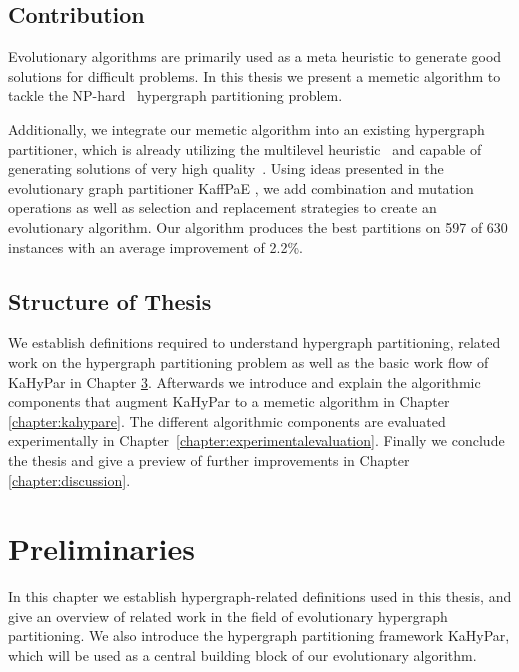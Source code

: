 \documentclass[a4paper,12pt,titlepage, BCOR7mm,headsepline]{scrbook}
\numberwithin{equation}{section}
\begin{document}
\section{Contribution}
Evolutionary algorithms are primarily used as a meta heuristic to generate good solutions for difficult problems. %
In this thesis we present a memetic algorithm to tackle the NP-hard~\cite{garey2002computers} hypergraph partitioning problem.

Additionally, we integrate our memetic algorithm into an existing hypergraph partitioner, which is already utilizing the multilevel heuristic~\cite{bulucc2016recent} and capable of generating solutions of very high quality~\cite{schlag2016k}. Using ideas presented in the evolutionary graph partitioner KaffPaE \cite{sanders2012distributed}, we add combination and mutation operations as well as selection and replacement strategies to create an evolutionary algorithm. Our algorithm produces the best partitions on 597 of 630 instances with an average improvement of 2.2\%.
\section{Structure of Thesis}
We establish definitions required to understand hypergraph partitioning, related work on the hypergraph partitioning problem as well as the basic work flow of KaHyPar in Chapter \ref{chapter:preliminaries}.
Afterwards we introduce and explain the algorithmic components that augment KaHyPar to a memetic algorithm in Chapter \ref{chapter:kahypare}. 
The different algorithmic components are evaluated experimentally in Chapter~\ref{chapter:experimentalevaluation}.
Finally we conclude the thesis and give a preview of further improvements in Chapter \ref{chapter:discussion}.
\chapter{Preliminaries}
\label{chapter:preliminaries}
In this chapter we establish hypergraph-related definitions used in this thesis, and give an overview of related work in the field of evolutionary hypergraph partitioning. We also introduce the hypergraph partitioning framework KaHyPar, which will be used as a central building block of our evolutionary algorithm.%
\end{document}
